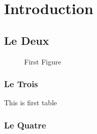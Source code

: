 \section{Introduction}
\subsection{Le Deux}
\begin{figure}[h!]
    \caption{First Figure}
\end{figure}
\subsubsection{Le Trois}
\begin{table}[h!]
    \caption{This is first table}
\end{table}
\subsubsection{Le Quatre}

